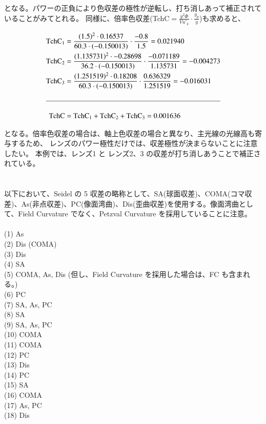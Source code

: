 \documentclass[a4paper,10pt]{jsarticle}
\begin{document}
となる。パワーの正負により色収差の極性が逆転し、打ち消しあって補正されていることがみてとれる。
同様に、倍率色収差(TchC$= \frac{y^2 \Phi}{V u'_k} \cdot \frac{y_p}{y}$)も求めると、

\begin{center}
\begin{align*}
\mathrm{TchC}_1 &= \frac{(1.5)^2 \cdot 0.16537}{60.3 \cdot (-0.150013)} \cdot \frac{-0.8}{1.5} = 0.021940 \\
\mathrm{TchC}_2 &= \frac{(1.135731)^2 \cdot -0.28698}{36.2 \cdot (-0.150013)} \cdot \frac{-0.071189}{1.135731}= -0.004273 \\
\mathrm{TchC}_3 &= \frac{(1.251519)^2 \cdot 0.18208}{60.3 \cdot (-0.150013)} \cdot \frac{0.636329}{1.251519}= -0.016031 \\
\\ \hline
\\
\mathrm{TchC} &= \mathrm{TchC}_1 + \mathrm{TchC}_2 + \mathrm{TchC}_3 = 0.001636
\end{align*}
\end{center}

となる。倍率色収差の場合は、軸上色収差の場合と異なり、主光線の光線高も寄与するため、
レンズのパワー極性だけでは、収差極性が決まらないことに注意したい。
本例では、レンズ1 と レンズ2、3 の収差が打ち消しあうことで補正されている。







\section{}
以下において、Seidel の 5 収差の略称として、SA(球面収差)、COMA(コマ収差)、As(非点収差)、PC(像面湾曲)、Dis(歪曲収差)を使用する。像面湾曲として、Field Curvature でなく、Petzval Curvature を採用していることに注意。\\
\\
(1) \; As \\
(2) \; Dis \; (COMA) \\
(3) \; Dis \\
(4) \; SA \\
(5) \; COMA, \; As, \; Dis \; (但し、Field Curvature を採用した場合は、FC も含まれる。) \\
(6) \; PC \\
(7) \; SA, \; As, \; PC \\
(8) \; SA \\
(9) \; SA, \; As, \; PC \\
(10) \; COMA \\
(11) \; COMA \\
(12) \; PC \\
(13) \; Dis \\
(14) \; PC \\
(15) \; SA \\
(16) \; COMA \\
(17) \; As, \; PC \\
(18) \; Dis \\
\end{document}
